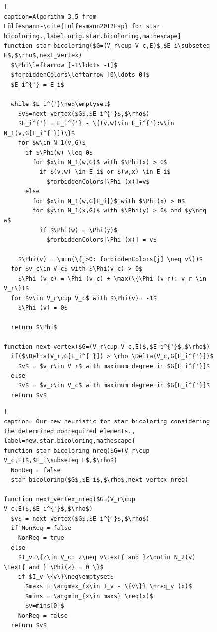 \documentclass[12pt, twoside,a4paper,toc=bibliography]{scrbook}
\DeclareMathOperator*{\argmin}{arg\,min}
\DeclareMathOperator*{\argmax}{arg\,max}
\newcommand{\nreq}{L}
\newcommand{\req}{M}
\begin{document}
\begin{figure}
\begin{lstlisting}[
caption=Algorithm 3.5 from Lülfesmann~\cite{Lulfesmann2012Fap} for star bicoloring.,label=orig.star.bicoloring,mathescape]
function star_bicoloring($G=(V_r\cup V_c,E)$,$E_i\subseteq E$,$\rho$,next_vertex)
  $\Phi\leftarrow [-1\ldots -1]$
  $forbiddenColors\leftarrow [0\ldots 0]$
  $E_i^{'} = E_i$
  
  while $E_i^{'}\neq\emptyset$
    $v$=next_vertex($G$,$E_i^{'}$,$\rho$)
    $E_i^{'} = E_i^{'} - \{(v,w)\in E_i^{'}:w\in N_1(v,G[E_i^{'}])\}$
    for $w\in N_1(v,G)$
      if $\Phi(w) \leq 0$
        for $x\in N_1(w,G)$ with $\Phi(x) > 0$
          if $(v,w) \in E_i$ or $(w,x) \in E_i$
            $forbiddenColors[\Phi (x)]=v$
      else
        for $x\in N_1(w,G[E_i])$ with $\Phi(x) > 0$
        for $y\in N_1(x,G)$ with $\Phi(y) > 0$ and $y\neq w$
          if $\Phi(w) = \Phi(y)$
            $forbiddenColors[\Phi (x)] = v$

    $\Phi(v) = \min(\{j>0: forbiddenColors[j] \neq v\})$
  for $v_c\in V_c$ with $\Phi(v_c) > 0$
    $\Phi (v_c) = \Phi (v_c) + \max(\{\Phi (v_r): v_r \in V_r\})$
  for $v\in V_r\cup V_c$ with $\Phi(v)= -1$
    $\Phi (v) = 0$

  return $\Phi$

function next_vertex($G=(V_r\cup V_c,E)$,$E_i^{'}$,$\rho$)
  if($\Delta(V_r,G[E_i^{'}]) > \rho \Delta(V_c,G[E_i^{'}])$
    $v$ = $v_r\in V_r$ with maximum degree in $G[E_i^{'}]$
  else
    $v$ = $v_c\in V_c$ with maximum degree in $G[E_i^{'}]$
  return $v$
\end{lstlisting}

\begin{lstlisting}[
caption= Our new heuristic for star bicoloring considering the determined nonrequired elements.,
label=new.star.bicoloring,mathescape]
function star_bicoloring_nreq($G=(V_r\cup V_c,E)$,$E_i\subseteq E$,$\rho$)
  NonReq = false
  star_bicoloring($G$,$E_i$,$\rho$,next_vertex_nreq)

function next_vertex_nreq($G=(V_r\cup V_c,E)$,$E_i^{'}$,$\rho$)
  $v$ = next_vertex($G$,$E_i^{'}$,$\rho$)
  if NonReq = false
    NonReq = true
  else
    $I_v=\{z\in V_c: z\neq v\text{ and }z\notin N_2(v) \text{ and } \Phi(z) = 0 \}$
    if $I_v-\{v\}\neq\emptyset$
      $maxs = \argmax_{x\in I_v - \{v\}} \nreq_v (x)$
      $mins = \argmin_{x\in maxs} \req(x)$
      $v=mins[0]$
    NonReq = false
  return $v$
\end{lstlisting}
\end{figure}
\end{document}
